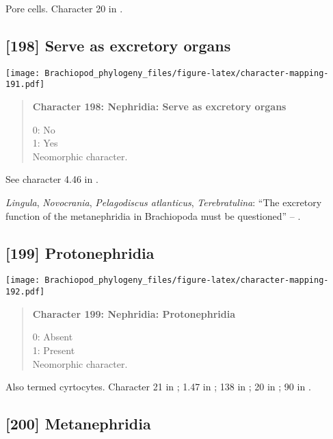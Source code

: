 \documentclass[openany]{book}
\theoremstyle{definition}
\theoremstyle{definition}
\theoremstyle{definition}
\theoremstyle{remark}
\begin{document}
Pore cells. Character 20 in \citet{Haszprunar2000}.

\subsection*{{[}198{]} Serve as excretory
organs}\label{serve-as-excretory-organs}

\texttt{[image: Brachiopod\_phylogeny\_files/figure-latex/character-mapping-191.pdf]}

\begin{quote}
\textbf{Character 198: Nephridia: Serve as excretory organs}

0: No\\
1: Yes\\
Neomorphic character.
\end{quote}

See character 4.46 in \citet{SPS1996}.

\hypertarget{Lingula-coding-198}{}
\emph{Lingula}, \emph{Novocrania}, \emph{Pelagodiscus atlanticus},
\emph{Terebratulina}: ``The excretory function of the metanephridia in
Brachiopoda must be questioned'' -- \citet{Luter1995}.

\subsection*{{[}199{]} Protonephridia}\label{protonephridia}

\texttt{[image: Brachiopod\_phylogeny\_files/figure-latex/character-mapping-192.pdf]}

\begin{quote}
\textbf{Character 199: Nephridia: Protonephridia}

0: Absent\\
1: Present\\
Neomorphic character.
\end{quote}

Also termed cyrtocytes. Character 21 in \citet{Grobe2007}; 1.47 in
\citet{SPS1996}; 138 in \citet{Rouse1999}; 20 in \citet{Haszprunar1996};
90 in \citet{Glenner2004}.

\subsection*{{[}200{]} Metanephridia}\label{metanephridia}
\end{document}
